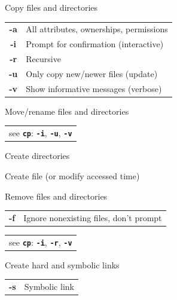 \documentclass[12pt, a4paper]
{article}
\begin{document}
\begin{multicols}{3}
		\begin{description}[nolistsep]
			\item[cp] Copy files and directories
			\item
			\begin{tabular}{cl}
				{\large \ttfamily \textbf{-a}} & All attributes, ownerships, permissions \\
				{\large \ttfamily \textbf{-i}} & Prompt for confirmation (interactive)\\
				{\large \ttfamily \textbf{-r}} & Recursive \\
				{\large \ttfamily \textbf{-u}} & Only copy new/newer files (update) \\
				{\large \ttfamily \textbf{-v}} & Show informative messages (verbose)\\
			\end{tabular}
			\item[mv] Move/rename files and directories
			\item
			\begin{tabular}{l}
				see \texttt{\textbf{cp}}: \texttt{\textbf{-i}}, \texttt{\textbf{-u}}, \texttt{\textbf{-v}}
			\end{tabular}
			\item[mkdir] Create directories
			\item[touch] Create file (or modify accessed time)
			\item[rm] Remove files and directories
			\item
			\begin{tabular}{cl}
				{\large \ttfamily \textbf{-f}} & Ignore nonexisting files, don't prompt
			\end{tabular}
			\item
			\begin{tabular}{l}
				see \texttt{\textbf{cp}}: \texttt{\textbf{-i}}, \texttt{\textbf{-r}}, \texttt{\textbf{-v}}
			\end{tabular}
			\item[ln] Create hard and symbolic links
			\item
			\begin{tabular}{cl}
				{\large \ttfamily \textbf{-s}} & Symbolic link
			\end{tabular}
		\end{description}
		
		

\end{multicols}
\end{document}
